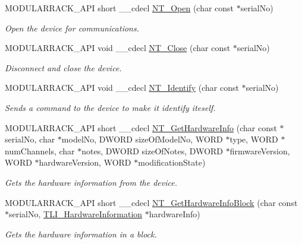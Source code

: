 \begin{DoxyCompactItemize}
\item 
M\+O\+D\+U\+L\+A\+R\+R\+A\+C\+K\+\_\+\+A\+PI short \+\_\+\+\_\+cdecl \hyperlink{group___modular_nano_trak_ga61333ee2d0bd4f4ca3e52af4659f9154}{N\+T\+\_\+\+Open} (char const $\ast$serial\+No)
\begin{DoxyCompactList}\small\item\em Open the device for communications. \end{DoxyCompactList}\item 
M\+O\+D\+U\+L\+A\+R\+R\+A\+C\+K\+\_\+\+A\+PI void \+\_\+\+\_\+cdecl \hyperlink{group___modular_nano_trak_gaea58520fa685893f5cec161629e9add5}{N\+T\+\_\+\+Close} (char const $\ast$serial\+No)
\begin{DoxyCompactList}\small\item\em Disconnect and close the device. \end{DoxyCompactList}\item 
M\+O\+D\+U\+L\+A\+R\+R\+A\+C\+K\+\_\+\+A\+PI void \+\_\+\+\_\+cdecl \hyperlink{group___modular_nano_trak_gac46c44644a2e49144403b67a5f7b3ce8}{N\+T\+\_\+\+Identify} (char const $\ast$serial\+No)
\begin{DoxyCompactList}\small\item\em Sends a command to the device to make it identify iteself. \end{DoxyCompactList}\item 
M\+O\+D\+U\+L\+A\+R\+R\+A\+C\+K\+\_\+\+A\+PI short \+\_\+\+\_\+cdecl \hyperlink{group___modular_nano_trak_gaf27e4423734f1f89b3dce9462e12e074}{N\+T\+\_\+\+Get\+Hardware\+Info} (char const $\ast$serial\+No, char $\ast$model\+No, D\+W\+O\+RD size\+Of\+Model\+No, W\+O\+RD $\ast$type, W\+O\+RD $\ast$num\+Channels, char $\ast$notes, D\+W\+O\+RD size\+Of\+Notes, D\+W\+O\+RD $\ast$firmware\+Version, W\+O\+RD $\ast$hardware\+Version, W\+O\+RD $\ast$modification\+State)
\begin{DoxyCompactList}\small\item\em Gets the hardware information from the device. \end{DoxyCompactList}\item 
M\+O\+D\+U\+L\+A\+R\+R\+A\+C\+K\+\_\+\+A\+PI short \+\_\+\+\_\+cdecl \hyperlink{group___modular_nano_trak_ga002a26a0386090832a90ef6b83d56e1d}{N\+T\+\_\+\+Get\+Hardware\+Info\+Block} (char const $\ast$serial\+No, \hyperlink{struct_t_l_i___hardware_information}{T\+L\+I\+\_\+\+Hardware\+Information} $\ast$hardware\+Info)
\begin{DoxyCompactList}\small\item\em Gets the hardware information in a block. \end{DoxyCompactList}\item 

\end{DoxyCompactItemize}
